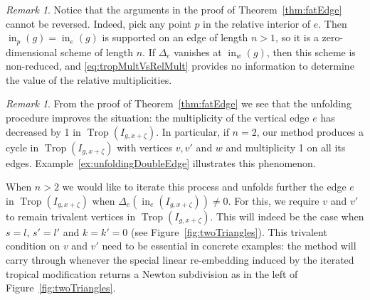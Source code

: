 \documentclass[11pt]{amsart}
\numberwithin{equation}{section}
\theoremstyle{plain}
\theoremstyle{definition}
\theoremstyle{remark}
\newtheorem{remark}[theorem]{Remark}
\begin{document}
\begin{remark}\label{rem:fatEdgeConverse} Notice that the arguments in the proof
  of Theorem~\ref{thm:fatEdge} cannot be reversed. Indeed, pick any
  point $p$ in the relative interior of $e$. Then
  $\operatorname{in}_p(g)=\operatorname{in}_e(g)$ is supported on an edge of length $n>1$, so
  it is  a zero-dimensional scheme of length $n$. If
  $\Delta_e$ vanishes at $\operatorname{in}_w(g)$, then this scheme is non-reduced, and 
\eqref{eq:tropMultVsRelMult} provides no information to determine
  the  value of the
  relative multiplicities.
\end{remark}

\begin{remark}\label{rem:unfoldingAndTrivalentOutcome}
  From the proof of Theorem~\ref{thm:fatEdge} we see that the
  unfolding procedure improves the situation: the multiplicity of the
  vertical edge $e$ has decreased by 1 in $\operatorname{Trop}(I_{g,x+{\zeta}})$.  In
  particular, if $n=2$, our method produces a cycle in
  $\operatorname{Trop}(I_{g,x+{\zeta}})$ with vertices $v,v'$ and $w$ and multiplicity 1
  on all its edges.  Example~\ref{ex:unfoldingDoubleEdge} illustrates
  this phenomenon.

  When $n>2$ we would like to iterate this process and unfolds further
  the edge $e$ in $\operatorname{Trop}(I_{g,x+{\zeta}})$ when
  $\Delta_e(\operatorname{in}_{e}(I_{g,x+{\zeta}}))\neq 0$. For this, we require $v$
  and $v'$ to remain trivalent vertices in $\operatorname{Trop}(I_{g,x+{\zeta}})$. This
  will indeed be the case when $s=l$, $s'=l'$ and $k=k'=0$ (see
  Figure~\ref{fig:twoTriangles}). This trivalent condition on $v$ and
  $v'$ need to be essential in concrete examples: the method will
  carry through whenever the special linear re-embedding induced by
  the iterated tropical modification returns a Newton subdivision as
  in the left of Figure~\ref{fig:twoTriangles}.
\end{remark}
\end{document}

